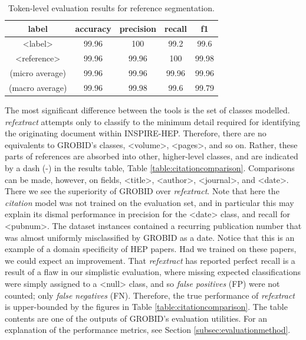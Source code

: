 \begin{table}[h]
\begin{center}
\begin{tabular}{|c|cccc|}
\hline
label           & accuracy  & precision  & recall   & f1 \\
\hline
<label>         & 99.96     & 100        & 99.2     & 99.6\\
<reference>     & 99.96     & 99.96      & 100      & 99.98\\
\hline
(micro average) & 99.96     & 99.96      & 99.96    & 99.96  \\
(macro average) & 99.96     & 99.98      & 99.6     & 99.79  \\
\hline
\end{tabular}
\caption[Token-level evaluation results for reference segmentation.]{Token-level evaluation results for reference segmentation.}
\label{table:referencesegmenterresults}
\end{center}
\end{table}

The most significant difference between the tools is the set of classes modelled. \emph{refextract} attempts only to classify to the minimum detail required for identifying the originating document within INSPIRE-HEP. Therefore, there are no equivalents to GROBID's classes, <volume>, <pages>, and so on. Rather, these parts of references are absorbed into other, higher-level classes, and are indicated by a dash (-) in the results table, Table \ref{table:citationcomparison}. Comparisons can be made, however, on fields, <title>, <author>, <journal>, and <date>. There we see the superiority of GROBID over \emph{refextract}. Note that here the \emph{citation} model was not trained on the evaluation set, and in particular this may explain its dismal performance in precision for the <date> class, and recall for <pubnum>. The dataset instances contained a recurring publication number that was almost uniformly misclassified by GROBID as a date. Notice that this is an example of a domain specificity of HEP papers. Had we trained on these papers, we could expect an improvement. That \emph{refextract} has reported perfect recall is a result of a flaw in our simplistic evaluation, where missing expected classifications were simply assigned to a <null> class, and so \emph{false positives} (FP) were not counted; only \emph{false negatives} (FN). Therefore, the true performance of \emph{refextract} is upper-bounded by the figures in Table \ref{table:citationcomparison}. The table contents are one of the outputs of GROBID's evaluation utilities. For an explanation of the performance metrics, see Section \ref{subsec:evaluationmethod}.


